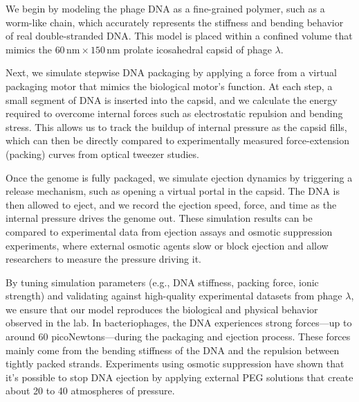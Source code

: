 \documentclass[12pt]{article}
\begin{document}
\begin{flushleft}

	
	
		





We begin by modeling the phage DNA as a fine-grained polymer, such as a worm-like chain, which accurately represents the stiffness and bending behavior of real double-stranded DNA. This model is placed within a confined volume that mimics the $60\,\text{nm} \times 150\,\text{nm}$ prolate icosahedral capsid of phage $\lambda$.
 


Next, we simulate stepwise DNA packaging by applying a force from a virtual packaging motor that mimics the biological motor’s function. At each step, a small segment of DNA is inserted into the capsid, and we calculate the energy required to overcome internal forces such as electrostatic repulsion and bending stress. This allows us to track the buildup of internal pressure as the capsid fills, which can then be directly compared to experimentally measured force-extension (packing) curves from optical tweezer studies.

Once the genome is fully packaged, we simulate ejection dynamics by triggering a release mechanism, such as opening a virtual portal in the capsid. The DNA is then allowed to eject, and we record the ejection speed, force, and time as the internal pressure drives the genome out. These simulation results can be compared to experimental data from ejection assays and osmotic suppression experiments, where external osmotic agents slow or block ejection and allow researchers to measure the pressure driving it.


By tuning simulation parameters (e.g., DNA stiffness, packing force, ionic strength) and validating against high-quality experimental datasets from phage $\lambda$, we ensure that our model reproduces the biological and physical behavior observed in the lab. In bacteriophages, the DNA experiences strong forces—up to around 60 picoNewtons—during the packaging and ejection process. These forces mainly come from the bending stiffness of the DNA and the repulsion between tightly packed strands. Experiments using osmotic suppression have shown that it's possible to stop DNA ejection by applying external PEG solutions that create about 20 to 40 atmospheres of pressure\cite{Grayson2006}.








\end{flushleft}
\end{document}
